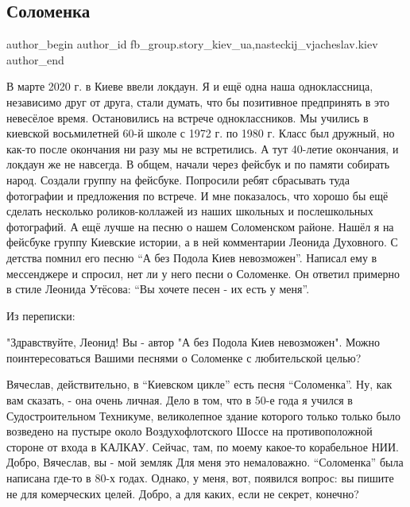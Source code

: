  
 
 
 
 
 
\subsection{Соломенка}
\label{sec:09_11_2021.fb.fb_group.story_kiev_ua.2.solomenka}
 
\ifcmt
 author_begin
   author_id fb_group.story_kiev_ua,nasteckij_vjacheslav.kiev
 author_end
\fi

В марте 2020 г. в Киеве ввели локдаун. Я и ещё одна наша одноклассница,
независимо друг от друга, стали думать, что бы позитивное предпринять в это
невесёлое время. Остановились на встрече одноклассников. Мы учились в киевской
восьмилетней 60-й  школе с 1972 г. по 1980 г. Класс был дружный, но как-то
после окончания ни разу мы не встретились. А тут 40-летие окончания, и локдаун
же не навсегда. В общем, начали через фейсбук и по памяти собирать народ.
Создали группу на фейсбуке. Попросили ребят сбрасывать туда фотографии и
предложения по встрече. И мне показалось, что хорошо бы ещё сделать несколько
роликов-коллажей из наших школьных и послешкольных фотографий. А ещё лучше на
песню о нашем Соломенском районе. Нашёл я на фейсбуке группу Киевские истории,
а в ней комментарии Леонида Духовного. С детства помнил его песню \enquote{А
без Подола Киев невозможен}. Написал ему в мессенджере и спросил, нет ли у него
песни о Соломенке. Он ответил примерно в стиле Леонида Утёсова: \enquote{Вы
хочете песен - их есть у меня}. 

Из переписки:

"Здравствуйте, Леонид! Вы - автор "А без Подола Киев невозможен". Можно
поинтересоваться Вашими песнями о Соломенке с любительской целью?

Вячеслав, действительно,  в \enquote{Киевском цикле} есть песня \enquote{Соломенка}. Ну, как
вам сказать, - она очень личная. Дело в том, что в 50-е года я учился в
Судостроительном Техникуме, великолепное здание которого только только было
возведено на пустыре около Воздухофлотского Шоссе на противоположной стороне от
входа в КАЛКАУ. Сейчас, там, по моему какое-то корабельное  НИИ. Добро,
Вячеслав, вы - мой земляк Для меня это немаловажно. \enquote{Соломенка} была написана
где-то в 80-х годах. Однако, у меня, вот,  появился вопрос:  вы пишите не для
комерческих целей. Добро, а для каких, если не секрет, конечно?

